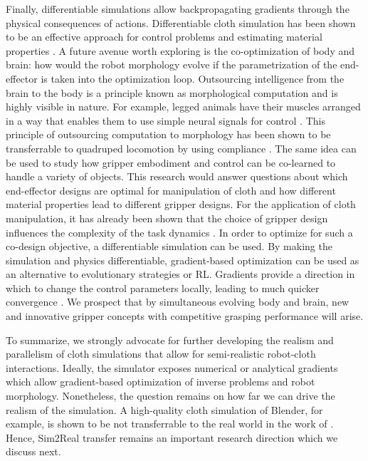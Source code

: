 \documentclass[\home/main.tex]{subfiles}
\begin{document}
Finally, differentiable simulations allow backpropagating gradients through the physical consequences of actions. Differentiable cloth simulation has been shown to be an effective approach for control problems and estimating material properties \autocite{Junbang2019,li2021diffcloth}.
A future avenue worth exploring is the co-optimization of body and brain: how would the robot morphology evolve if the parametrization of the end-effector is taken into the optimization loop. Outsourcing intelligence from the brain to the body is a principle known as morphological computation \autocite{Rolf2006} and is highly visible in nature. For example, legged animals have their muscles arranged in a way that enables them to use simple neural signals for control \autocite{MacKay-Lyons2002}.
This principle of outsourcing computation to morphology has been shown to be transferrable to quadruped locomotion by using compliance \autocite{Urbain2021}. The same idea can be used to study how gripper embodiment and control can be co-learned to handle a variety of objects. This research would answer questions about which end-effector designs are optimal for manipulation of cloth and how different material properties lead to different gripper designs. For the application of cloth manipulation, it has already been shown that the choice of gripper design influences the complexity of the task dynamics \autocite{Borras2020}. In order to optimize for such a co-design objective, a differentiable simulation can be used. By making the simulation and physics differentiable, gradient-based optimization can be used as an alternative to evolutionary strategies or \gls{RL}. Gradients provide a direction in which to change the control parameters locally, leading to much quicker convergence \autocite{Degrave2019, li2021diffcloth}.
We prospect that by simultaneous evolving body and brain, new and innovative gripper concepts with competitive grasping performance will arise.

To summarize, we strongly advocate for further developing the realism and parallelism of cloth simulations that allow for semi-realistic robot-cloth interactions. Ideally, the simulator exposes numerical or analytical gradients which allow gradient-based optimization of inverse problems and robot morphology. Nonetheless, the question remains on how far we can drive the realism of the simulation. A high-quality cloth simulation of Blender, for example, is shown to be not transferrable to the real world in the work of \autocite{Tanaka2018}. Hence, Sim2Real transfer remains an important research direction which we discuss next.
\end{document}
